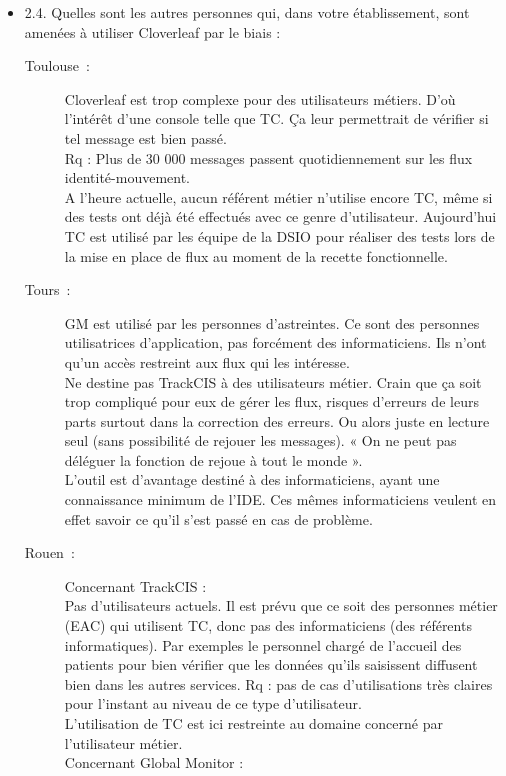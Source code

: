 \begin{itemize}
	   \item 2.4. Quelles sont les autres personnes qui, dans votre établissement,
	   sont amenées à utiliser Cloverleaf par le biais :
	   	\begin{description}
		  	\item[Toulouse~:] Cloverleaf est trop complexe pour des utilisateurs
		  	métiers. D’où l’intérêt d’une console telle que TC. Ça leur permettrait de
		  	vérifier si tel message est bien passé.\\
			Rq : Plus de 30 000 messages passent quotidiennement sur les flux
			identité-mouvement.\\
			A l’heure actuelle, aucun référent métier n’utilise encore TC, même si des
			tests ont déjà été effectués avec ce genre d’utilisateur. Aujourd’hui TC est
			utilisé par les équipe de la DSIO pour réaliser des tests lors de la mise en
			place de flux au moment de la recette fonctionnelle.
		  	\item[Tours~:] GM est utilisé par les personnes d’astreintes. Ce sont des
		  	personnes utilisatrices d’application, pas forcément des informaticiens.
		  	Ils n’ont qu’un accès restreint aux flux qui les intéresse.\\
			Ne destine pas TrackCIS à des utilisateurs métier. Crain que ça soit trop
			compliqué pour eux de gérer les flux, risques d’erreurs de leurs parts
			surtout dans la correction des erreurs. Ou alors juste en lecture seul (sans
			possibilité de rejouer les messages). « On ne peut pas déléguer la fonction
			de rejoue à tout le monde ».\\
			L’outil est d’avantage destiné à des informaticiens, ayant une connaissance
			minimum de l’IDE. Ces mêmes informaticiens veulent en effet savoir ce qu’il
			s’est passé en cas de problème.
		  	\item[Rouen~:] Concernant TrackCIS :\\
			Pas d’utilisateurs actuels. Il est prévu que ce soit des personnes métier
			(EAC) qui utilisent TC, donc pas des informaticiens (des référents
			informatiques). Par exemples le personnel chargé de l’accueil des patients
			pour bien vérifier que les données qu’ils saisissent diffusent bien dans les
			autres services. Rq : pas de cas d’utilisations très claires pour l’instant
			au niveau de ce type d’utilisateur.\\
			L’utilisation de TC est ici restreinte au domaine concerné par l’utilisateur
			métier.\\
			Concernant Global Monitor :\\

\end{description}
\end{itemize}
